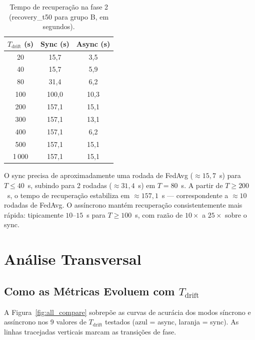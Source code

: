 \documentclass[12pt, a4paper]{article}
\begin{document}
\begin{table}[H]
\centering
\caption{Tempo de recuperação na fase 2 (recovery\_t50 para grupo B, em segundos).}
\label{tab:recovery}
\renewcommand{\arraystretch}{1.2}
\begin{tabular}{ccc}
\toprule
$T_{\text{drift}}$ (s) & Sync (s) & Async (s) \\
\midrule
20   & 15{,}7 & 3{,}5 \\
40   & 15{,}7 & 5{,}9 \\
80   & 31{,}4 & 6{,}2 \\
100  & 100{,}0 & 10{,}3 \\
200  & 157{,}1 & 15{,}1 \\
300  & 157{,}1 & 13{,}1 \\
400  & 157{,}1 & 6{,}2 \\
500  & 157{,}1 & 15{,}1 \\
1\,000 & 157{,}1 & 15{,}1 \\
\bottomrule
\end{tabular}
\end{table}

O sync precisa de aproximadamente uma rodada de FedAvg ($\approx 15{,}7$~s)
para $T \leq 40$~s, subindo para 2 rodadas ($\approx 31{,}4$~s) em $T = 80$~s.
A partir de $T \geq 200$~s, o tempo de recuperação estabiliza em
$\approx 157{,}1$~s --- correspondente a $\approx 10$ rodadas de FedAvg. O
assíncrono mantém recuperação consistentemente mais rápida: tipicamente
$10$--$15$~s para $T \geq 100$~s, com razão de $10{\times}$ a $25{\times}$
sobre o sync.

\section{Análise Transversal}

\subsection{Como as Métricas Evoluem com $T_{\text{drift}}$}

A Figura~\ref{fig:all_compare} sobrepõe as curvas de acurácia dos modos síncrono
e assíncrono nos 9 valores de $T_{\text{drift}}$ testados (azul = async,
laranja = sync). As linhas tracejadas verticais marcam as transições de fase.
\end{document}
